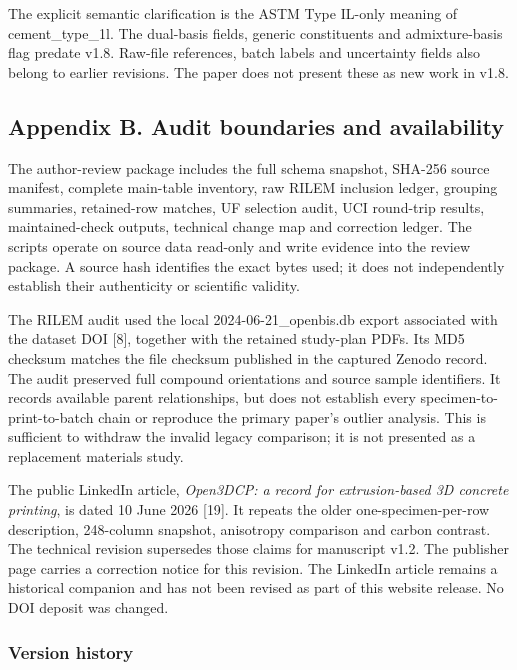 \documentclass[
  american,
  11pt,
  letterpaper,
]{article}
\renewcommand{\texttt}[1]{{\ttfamily\fontsize{9.5}{11}\selectfont\hyphenchar\font=-1 #1}}
\begin{document}
The explicit semantic clarification is the ASTM Type IL-only meaning of
\texttt{cement\_type\_1l}. The dual-basis fields, generic constituents
and admixture-basis flag predate v1.8. Raw-file references, batch labels
and uncertainty fields also belong to earlier revisions. The paper does
not present these as new work in v1.8.

\subsection{Appendix B. Audit boundaries and
availability}\label{appendix-b.-audit-boundaries-and-availability}

The author-review package includes the full schema snapshot, SHA-256
source manifest, complete main-table inventory, raw RILEM inclusion
ledger, grouping summaries, retained-row matches, UF selection audit,
UCI round-trip results, maintained-check outputs, technical change map
and correction ledger. The scripts operate on source data read-only and
write evidence into the review package. A source hash identifies the
exact bytes used; it does not independently establish their authenticity
or scientific validity.

The RILEM audit used the local \texttt{2024-06-21\_openbis.db} export
associated with the dataset DOI {[}8{]}, together with the retained
study-plan PDFs. Its MD5 checksum matches the file checksum published in
the captured Zenodo record. The audit preserved full compound
orientations and source sample identifiers. It records available parent
relationships, but does not establish every specimen-to-print-to-batch
chain or reproduce the primary paper's outlier analysis. This is
sufficient to withdraw the invalid legacy comparison; it is not
presented as a replacement materials study.

The public LinkedIn article, \emph{Open3DCP: a record for
extrusion-based 3D concrete printing}, is dated 10 June 2026 {[}19{]}.
It repeats the older one-specimen-per-row description, 248-column
snapshot, anisotropy comparison and carbon contrast. The technical
revision supersedes those claims for manuscript v1.2. The publisher page
carries a correction notice for this revision. The LinkedIn article
remains a historical companion and has not been revised as part of this
website release. No DOI deposit was changed.

\subsubsection{Version history}\label{version-history}
\end{document}
